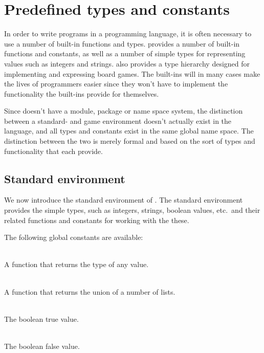 \section{Predefined types and constants}
\label{sec:predefined}

In order to write programs in a programming language, it is often necessary to use a number of built-in
functions and types. \productname{} provides a number of built-in functions and constants, as well as 
a number of simple types for representing values such as integers and strings. \productname{} also provides
a type hierarchy designed for implementing and expressing board games. The built-ins will in many cases make
the lives of \productname{} programmers easier since they won't have to
implement the functionality the built-ins
provide for themselves.

Since \productname{} doesn't have a module, package or name space system, the distinction between a standard-
and game environment doesn't actually exist in the language, and all types and constants exist in the same
global name space. The distinction between the two is merely formal and based on the sort of types and functionality
that each provide.
 
\subsection{Standard environment}
\label{sec:standardenvironment}

We now introduce the standard environment of \productname{}. The standard environment provides the simple types, such as
integers, strings, boolean values, etc.\ and their related functions and constants for working with the these.

The following global constants are available:

\begin{dlist}
  \item {}\\
    A function that returns the type of any value.
  \item {}\\
    A function that returns the union of a number of lists.
  \item {}\\
    The boolean true value.
  \item {}\\
    The boolean false value.
\end{dlist}

